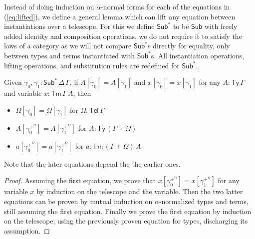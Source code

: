 \documentclass[sigplan,10pt,anonymous,review]{acmart}\settopmatter{printfolios=true,printccs=false,printacmref=false}
\newcommand{\Ty}{\mathsf{Ty}}
\newcommand{\Tm}{\mathsf{Tm}}
\newcommand{\Sub}{\mathsf{Sub}}
\newcommand{\Tel}{\mathsf{Tel}}
\begin{document}
Instead of doing induction on $\alpha$-normal forms for each of the equations in
(\ref{eq:lifted}), we define a general lemma which can lift any equation between
instantiations over a telescope. For this we define $\Sub^*$ to be $\Sub$ with
freely added identity and composition operations, we do not require it to
satisfy the laws of a category as we will not compare $\Sub^*$s directly for
equality, only between types and terms instantiated with $\Sub^*$s. All
instantiation operations, lifting operations, and substitution rules are
redefined for $\Sub^*$.
\begin{lemma}
  \label{thm:lifting}
  Given $\gamma_0, \gamma_1 : \Sub^*\,\Delta\,\Gamma$, if $A[\gamma_0] =
  A[\gamma_1]$ and $x[\gamma_0] = x[\gamma_1]$ for any $A:\Ty\,\Gamma$ and
  variable $x:\Tm\,\Gamma\,A$, then
  \begin{itemize}
    \item $\Omega[\gamma_0] = \Omega[\gamma_1]$ for $\Omega:\Tel\,\Gamma$
    \item $A[\gamma_0^{+^\Omega}] = A[\gamma_1^{+^\Omega}]$ for $A:\Ty\,(\Gamma+\Omega)$
    \item $a[\gamma_0^{+^\Omega}] = a[\gamma_1^{+^\Omega}]$ for $a:\Tm\,(\Gamma+\Omega)\,A$
  \end{itemize}
  Note that the later equations depend the the earlier ones.
\end{lemma}
\begin{proof}
  Assuming the first equation, we prove that $x[\gamma_0^{+^\Omega}] =
  x[\gamma_1^{+^\Omega}]$ for any variable $x$ by induction on the telescope and
  the variable. Then the two latter equations can be proven by mutual induction
  on $\alpha$-normalized types and terms, still assuming the first equation.
  Finally we prove the first equation by induction on the telescope, using the
  previously proven equation for types, discharging its assumption.
\end{proof}
\end{document}

